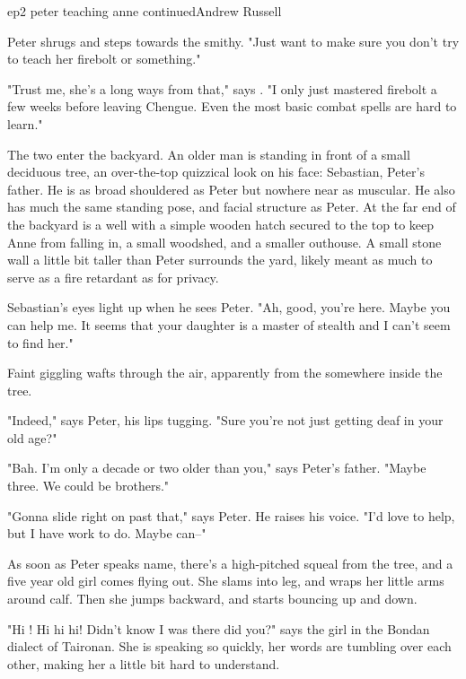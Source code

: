 \documentclass{book}
\begin{document}
\begin{childnode}{ep2 peter teaching anne continued}{Andrew Russell}


    Peter shrugs and steps towards the smithy. "Just want to make sure you don't try to teach her firebolt or something."

    "Trust me, she's a long ways from that," says \name{}. "I only just mastered firebolt a few weeks before leaving Chengue. Even the most basic combat spells are hard to learn." 

    The two enter the backyard. An older man is standing in front of a small deciduous tree, an over-the-top quizzical look on his face: Sebastian, Peter's father. He is as broad shouldered as Peter but nowhere near as muscular. He also has much the 
    same standing pose, and
    facial structure as Peter. At the far end of the backyard is a well with a simple wooden hatch secured to the top to keep Anne from falling in, a small woodshed, and a smaller outhouse. A small stone wall a little bit
    taller than Peter surrounds the yard, likely meant as much to serve as a fire retardant as for privacy.
    
    Sebastian's eyes light up when he sees Peter. "Ah, good, you're here. Maybe you can help me. It seems that your daughter is a master of stealth and I can't seem to find her."

    Faint giggling wafts through the air, apparently from the somewhere inside the tree.

    "Indeed," says Peter, his lips tugging. "Sure you're not just getting deaf in your old age?"

    "Bah. I'm only a decade or two older than you," says Peter's father. "Maybe three. We could be brothers."

    "Gonna slide right on past that," says Peter. He raises his voice. "I'd love to help, but I have work to do. Maybe \name{} can--"

    As soon as Peter speaks \names{} name, there's a high-pitched squeal from the tree, and a five year old girl comes flying out. She slams into \names{} leg, and wraps her little arms around 
    \hisher{} calf. Then she jumps backward, and starts bouncing up and down.

    "Hi \nickname{}! Hi hi hi! Didn't know I was there did you?" says the girl in the Bondan dialect of Taironan. She is speaking so quickly, her words are tumbling over each other, making her a 
    little bit hard to understand.


\end{childnode}
\end{document}
